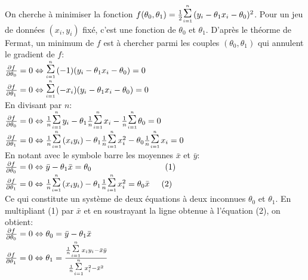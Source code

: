 On cherche à minimiser la fonction $f(\theta_0, \theta_1) = \frac{1}{2} \ssumm{i=1}{n} (y_i - \theta_1 x_i - \theta_0)^2$. Pour un jeu de données $(x_i, y_i)$ fixé, c'est une fonction de $\theta_0$ et $\theta_1$. D'après le théorme de Fermat, un minimum de $f$ est à chercher parmi les couples $(\theta_0, \theta_1)$ qui annulent le gradient de $f$: \\
$\frac{\partial f}{\partial \theta_0} = 0 \Leftrightarrow \ssumm{i=1}{n} (-1) (y_i - \theta_1 x_i - \theta_0) = 0$ \\
$\frac{\partial f}{\partial \theta_1} = 0 \Leftrightarrow \ssumm{i=1}{n} (-x_i) (y_i - \theta_1 x_i - \theta_0) = 0$ \\

En divisant par $n$:\\
$\frac{\partial f}{\partial \theta_0} = 0 \Leftrightarrow \frac{1}{n} \ssumm{i=1}{n} y_i - \theta_1 \frac{1}{n} \ssumm{i=1}{n} x_i - \frac{1}{n} \ssumm{i=1}{n} \theta_0 = 0$ \\
$\frac{\partial f}{\partial \theta_1} = 0 \Leftrightarrow \frac{1}{n} \ssumm{i=1}{n} (x_i y_i) - \theta_1 \frac{1}{n} \ssumm{i=1}{n} x_i^2 - \theta_0 \frac{1}{n} \ssumm{i=1}{n} x_i = 0$ \\

En notant avec le symbole barre les moyennes $\bar{x}$ et $\bar{y}$:\\
$\frac{\partial f}{\partial \theta_0} = 0 \Leftrightarrow \bar{y} - \theta_1 \bar{x} = \theta_0  \hspace{31mm} (1)$ \\
$\frac{\partial f}{\partial \theta_1} = 0 \Leftrightarrow  \frac{1}{n} \ssumm{i=1}{n} (x_i y_i) - \theta_1 \frac{1}{n} \ssumm{i=1}{n} x_i^2 = \theta_0 \bar{x} \hspace{5mm} (2)$ \\

Ce qui constitute un système de deux équations à deux inconnues $\theta_0$ et $\theta_1$. En multipliant (1) par $\bar{x}$ et en soustrayant la ligne obtenue à l'équation (2), on obtient: \\
$\frac{\partial f}{\partial \theta_0} = 0 \Leftrightarrow \theta_0 = \bar{y} - \theta_1 \bar{x} \hspace{11mm}$ \\
$\frac{\partial f}{\partial \theta_1} = 0 \Leftrightarrow \theta_1 = \frac{\frac{1}{n} \ssumm{i=1}{n} x_i y_i - \bar{x} \bar{y}}{\frac{1}{n} \ssumm{i=1}{n} x_i^2 - \bar{x}^2} \hspace{5mm}$ \\




